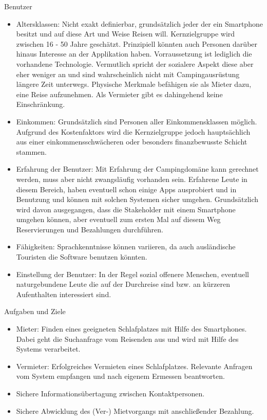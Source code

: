 Benutzer
\begin{itemize}
   \item 
   Altersklassen: Nicht exakt definierbar, grundsätzlich jeder der ein Smartphone besitzt und auf diese Art und Weise Reisen will. Kernzielgruppe wird zwischen 16 - 50 Jahre geschätzt. Prinzipiell könnten auch Personen darüber hinaus Interesse an der Applikation haben. Vorraussetzung ist lediglich die vorhandene Technologie. Vermutlich spricht der sozialere Aspekt diese aber eher weniger an und sind wahrscheinlich nicht mit Campingausrüstung längere Zeit unterwegs. Physische Merkmale befähigen sie als Mieter dazu, eine Reise aufzunehmen. Als Vermieter gibt es dahingehend keine Einschränkung.

   \item 
   Einkommen: Grundsätzlich sind Personen aller Einkommensklassen möglich. Aufgrund des Kostenfaktors wird die Kernzielgruppe jedoch hauptsächlich aus einer einkommensschwächeren oder besonders finanzbewusste Schicht stammen.

   \item 
   Erfahrung der Benutzer: Mit Erfahrung der Campingdomäne kann gerechnet werden, muss aber nicht zwangsläufig vorhanden sein.
   Erfahrene Leute in diesem Bereich, haben eventuell schon einige Apps ausprobiert und in Benutzung und können mit solchen Systemen sicher umgehen.
   Grundsätzlich wird davon ausgegangen, dass die Stakeholder mit einem Smartphone umgehen können, aber eventuell zum ersten Mal auf diesem Weg Reservierungen und Bezahlungen durchführen. 

   \item
   Fähigkeiten: Sprachkenntnisse können variieren, da auch ausländische Touristen die Software benutzen könnten.

   \item 
   Einstellung der Benutzer: In der Regel sozial offenere Menschen, eventuell naturgebundene Leute die auf der Durchreise sind bzw. an kürzeren Aufenthalten interessiert sind. 

   
\end{itemize}

\newpage

Aufgaben und Ziele
\begin{itemize}
   \item 
   Mieter: Finden eines geeigneten Schlafplatzes mit Hilfe des Smartphones. Dabei geht die Suchanfrage vom Reisenden aus und wird mit Hilfe des Systems verarbeitet. 
   \item 
   Vermieter: Erfolgreiches Vermieten eines Schlafplatzes. Relevante Anfragen vom System empfangen und nach eigenem Ermessen beantworten. 
   \item
   Sichere Informationsübertagung zwischen Kontaktpersonen.
   \item
   Sichere Abwicklung des (Ver-) Mietvorgangs mit anschließender Bezahlung.\\  


\end{itemize}


